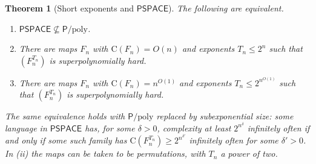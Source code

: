\documentclass[11pt]{article}
\newtheorem{theorem}{Theorem}[section]
\theoremstyle{definition}
\theoremstyle{remark}
\newcommand{\CC}{\mathrm{C}}
\numberwithin{equation}{section}
\begin{document}
\begin{theorem}[Short exponents and $\mathsf{PSPACE}$]\label{thm:pspace-short}
The following are equivalent.
\begin{enumerate}[label=(\roman*)]
\item $\mathsf{PSPACE}\not\subseteq\mathsf{P}/\mathrm{poly}$.
\item There are maps $F_n$ with $\CC(F_n)=O(n)$ and exponents
  $T_n\leq 2^n$ such that $(F_n^{T_n})$ is superpolynomially hard.
\item There are maps $F_n$ with $\CC(F_n)=n^{O(1)}$ and exponents
  $T_n\leq 2^{n^{O(1)}}$ such that $(F_n^{T_n})$ is superpolynomially hard.
\end{enumerate}
The same equivalence holds with $\mathsf{P}/\mathrm{poly}$ replaced by
subexponential size: some language in $\mathsf{PSPACE}$ has, for some
$\delta>0$, complexity at least $2^{n^\delta}$ infinitely often if and
only if some such family has $\CC(F_n^{T_n})\geq 2^{n^{\delta'}}$
infinitely often for some $\delta'>0$.  In (ii) the maps can be taken
to be permutations, with $T_n$ a power of two.
\end{theorem}
\end{document}
